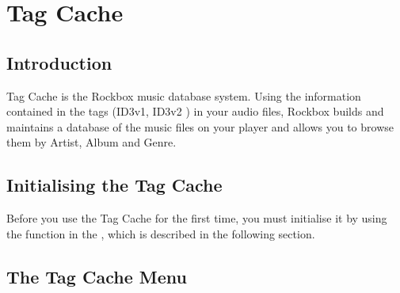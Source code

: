 \section{\label{ref:tagcache}Tag Cache} 

\subsection{Introduction}
Tag Cache is the Rockbox music database system. Using the information
contained in the tags (ID3v1, ID3v2%
) in your audio files, Rockbox builds and maintains a database of the music
files on your player and allows you to browse them by Artist, Album and Genre.

\subsection{Initialising the Tag Cache}
Before you use the Tag Cache for the first time, you must initialise it by using
the  function in the , which is
described in the following section.

\subsection{\label{ref:tagcachemenu}The Tag Cache Menu}

